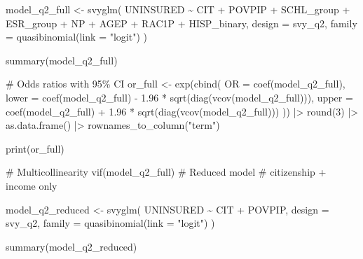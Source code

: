 \documentclass[
  letterpaper,
  DIV=11,
  numbers=noendperiod]{scrartcl}
\newenvironment{Shaded}{\begin{snugshade}}{\end{snugshade}}
\newcommand{\AttributeTok}[1]{\textcolor[rgb]{0.40,0.45,0.13}{#1}}
\newcommand{\CommentTok}[1]{\textcolor[rgb]{0.37,0.37,0.37}{#1}}
\newcommand{\DecValTok}[1]{\textcolor[rgb]{0.68,0.00,0.00}{#1}}
\newcommand{\FloatTok}[1]{\textcolor[rgb]{0.68,0.00,0.00}{#1}}
\newcommand{\FunctionTok}[1]{\textcolor[rgb]{0.28,0.35,0.67}{#1}}
\newcommand{\NormalTok}[1]{\textcolor[rgb]{0.00,0.23,0.31}{#1}}
\newcommand{\OtherTok}[1]{\textcolor[rgb]{0.00,0.23,0.31}{#1}}
\newcommand{\SpecialCharTok}[1]{\textcolor[rgb]{0.37,0.37,0.37}{#1}}
\newcommand{\StringTok}[1]{\textcolor[rgb]{0.13,0.47,0.30}{#1}}
\begin{document}
\begin{Shaded}
\begin{Highlighting}[]
\NormalTok{model\_q2\_full }\OtherTok{\textless{}{-}} \FunctionTok{svyglm}\NormalTok{(}
\NormalTok{  UNINSURED }\SpecialCharTok{\textasciitilde{}}\NormalTok{ CIT }\SpecialCharTok{+}\NormalTok{ POVPIP }\SpecialCharTok{+}\NormalTok{ SCHL\_group }\SpecialCharTok{+}\NormalTok{ ESR\_group }\SpecialCharTok{+}\NormalTok{ NP }\SpecialCharTok{+}\NormalTok{ AGEP }\SpecialCharTok{+}\NormalTok{ RAC1P }\SpecialCharTok{+}\NormalTok{ HISP\_binary,}
  \AttributeTok{design =}\NormalTok{ svy\_q2,}
  \AttributeTok{family =} \FunctionTok{quasibinomial}\NormalTok{(}\AttributeTok{link =} \StringTok{"logit"}\NormalTok{)}
\NormalTok{)}

\FunctionTok{summary}\NormalTok{(model\_q2\_full)}

\CommentTok{\# Odds ratios with 95\% CI}
\NormalTok{or\_full }\OtherTok{\textless{}{-}} \FunctionTok{exp}\NormalTok{(}\FunctionTok{cbind}\NormalTok{(}
  \AttributeTok{OR    =} \FunctionTok{coef}\NormalTok{(model\_q2\_full),}
  \AttributeTok{lower =} \FunctionTok{coef}\NormalTok{(model\_q2\_full) }\SpecialCharTok{{-}} \FloatTok{1.96} \SpecialCharTok{*} \FunctionTok{sqrt}\NormalTok{(}\FunctionTok{diag}\NormalTok{(}\FunctionTok{vcov}\NormalTok{(model\_q2\_full))),}
  \AttributeTok{upper =} \FunctionTok{coef}\NormalTok{(model\_q2\_full) }\SpecialCharTok{+} \FloatTok{1.96} \SpecialCharTok{*} \FunctionTok{sqrt}\NormalTok{(}\FunctionTok{diag}\NormalTok{(}\FunctionTok{vcov}\NormalTok{(model\_q2\_full)))}
\NormalTok{)) }\SpecialCharTok{|\textgreater{}}
  \FunctionTok{round}\NormalTok{(}\DecValTok{3}\NormalTok{) }\SpecialCharTok{|\textgreater{}}
  \FunctionTok{as.data.frame}\NormalTok{() }\SpecialCharTok{|\textgreater{}}
  \FunctionTok{rownames\_to\_column}\NormalTok{(}\StringTok{"term"}\NormalTok{)}

\FunctionTok{print}\NormalTok{(or\_full)}

\CommentTok{\# Multicollinearity}
\FunctionTok{vif}\NormalTok{(model\_q2\_full)}
\CommentTok{\# Reduced model}
\CommentTok{\# citizenship + income only}

\NormalTok{model\_q2\_reduced }\OtherTok{\textless{}{-}} \FunctionTok{svyglm}\NormalTok{(}
\NormalTok{  UNINSURED }\SpecialCharTok{\textasciitilde{}}\NormalTok{ CIT }\SpecialCharTok{+}\NormalTok{ POVPIP,}
  \AttributeTok{design =}\NormalTok{ svy\_q2,}
  \AttributeTok{family =} \FunctionTok{quasibinomial}\NormalTok{(}\AttributeTok{link =} \StringTok{"logit"}\NormalTok{)}
\NormalTok{)}

\FunctionTok{summary}\NormalTok{(model\_q2\_reduced)}


\end{Highlighting}
\end{Shaded}
\end{document}
